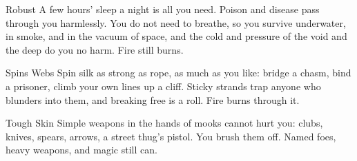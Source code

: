 \begin{feat}{Robust}
A few hours' sleep a night is all you need. Poison and disease pass
through you harmlessly. You do not need to breathe, so you survive
underwater, in smoke, and in the vacuum of space, and the cold and
pressure of the void and the deep do you no harm. Fire still burns.
\end{feat}

\begin{feat}{Spins Webs}
Spin silk as strong as rope, as much as you like: bridge a chasm, bind a
prisoner, climb your own lines up a cliff. Sticky strands trap anyone
who blunders into them, and breaking free is a  roll.
Fire burns through it.
\end{feat}

\begin{feat}{Tough Skin}
Simple weapons in the hands of mooks cannot hurt you: clubs, knives,
spears, arrows, a street thug's pistol. You brush them off. Named
foes, heavy weapons, and magic still can.
\end{feat}
